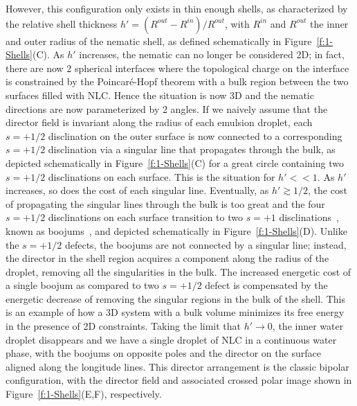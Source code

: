 However, this configuration only exists in thin enough shells, as characterized by the relative shell thickness $h' = (R^{out}-R^{in})/R^{out}$, with $R^{in}$ and $R^{out}$ the inner and outer radius of the nematic shell, as defined schematically in Figure~\ref{f:1-Shells}(C).
As $h'$ increases, the nematic can no longer be considered 2D; in fact, there are now 2 spherical interfaces where the topological charge on the interface is constrained by the Poincar\'e-Hopf theorem with a bulk region between the two surfaces filled with NLC.
Hence the situation is now 3D and the nematic directions are now parameterized by 2 angles.
If we naively assume that the director field is invariant along the radius of each emulsion droplet, each $s = +1/2$ disclination on the outer surface is now connected to a corresponding $s = +1/2$ disclination via a singular line that propagates through the bulk, as depicted schematically in Figure~\ref{f:1-Shells}(C) for a great circle containing two $s = +1/2$ disclinations on each surface.
This is the situation for $h'<<1$.
As $h'$ increases, so does the cost of each singular line.
Eventually, as $h'\gtrsim 1/2$, the cost of propagating the singular lines through the bulk is too great and the four $s = +1/2$ disclinations on each surface transition to two $s = +1$ disclinations~\cite{RN105}, known as boojums~\cite{RN273}, and depicted schematically in Figure~\ref{f:1-Shells}(D).
Unlike the $s = +1/2$ defects, the boojums are not connected by a singular line; instead, the director in the shell region acquires a component along the radius of the droplet, removing all the singularities in the bulk.
The increased energetic cost of a single boojum as compared to two $s = +1/2$ defect is compensated by the energetic decrease of removing the singular regions in the bulk of the shell.
This is an example of how a 3D system with a bulk volume minimizes its free energy in the presence of 2D constraints.
Taking the limit that $h' \rightarrow 0$, the inner water droplet disappears and we have a single droplet of NLC in a continuous water phase, with the boojums on opposite poles and the director on the surface aligned along the longitude lines.
This director arrangement is the classic bipolar configuration, with the director field and associated crossed polar image shown in Figure~\ref{f:1-Shells}(E,F), respectively.

